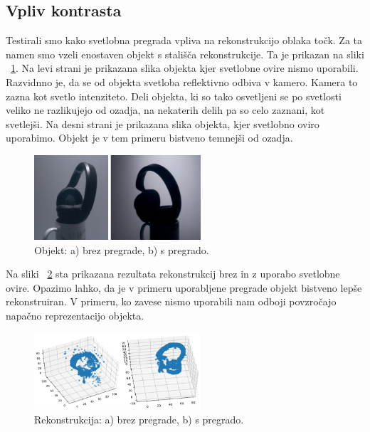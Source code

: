 \documentclass[journal,a4paper,twoside]{sty/IEEEtran}
\begin{document}
\subsection{Vpliv kontrasta}
Testirali smo kako svetlobna pregrada vpliva na rekonstrukcijo oblaka točk. Za ta namen smo vzeli enostaven objekt s stališča rekonstrukcije. Ta je prikazan na sliki ~\ref{fig:slusalkEE}. Na levi strani je prikazana slika objekta kjer svetlobne ovire nismo uporabili. Razvidnno je, da se od objekta svetloba reflektivno odbiva v kamero. Kamera to zazna kot svetlo intenziteto. Deli objekta, ki so tako osvetljeni se po svetlosti veliko ne razlikujejo od ozadja, na nekaterih delih pa so celo zaznani, kot svetlejši. Na desni strani je prikazana slika objekta, kjer svetlobno oviro uporabimo. Objekt je v tem primeru bistveno temnejši od ozadja.

\begin{figure}[H]
	\centerline{\includegraphics[width=6.2cm]{fig/slusalke_1}}
	\caption{Objekt: a) brez pregrade, b) s pregrado.}
	\label{fig:slusalkEE}
\end{figure}

Na sliki ~\ref{fig:slusalke} sta prikazana rezultata rekonstrukcij brez in z uporabo svetlobne ovire. Opazimo lahko, da je v primeru uporabljene pregrade objekt bistveno lepše rekonstruiran. V primeru, ko zavese nismo uporabili nam odboji povzročajo napačno reprezentacijo objekta. 



\begin{figure}[H]
	\centerline{\includegraphics[width=6.2cm]{fig/slusalke}}
	\caption{Rekonstrukcija: a) brez pregrade, b) s pregrado.}
	\label{fig:slusalke}
\end{figure}
\end{document}
